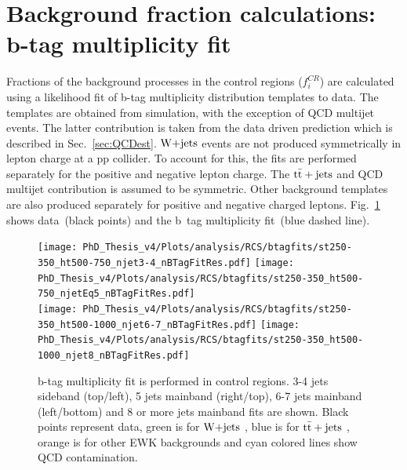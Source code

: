 \section{Background fraction calculations: b-tag multiplicity fit}
\label{sec:bkgcomp}
Fractions of the background processes in the control regions ($f^{CR}_i$) are calculated using a likelihood fit of b-tag multiplicity distribution templates to data. The templates are obtained from simulation, with the exception of QCD multijet events. The latter contribution is taken from the data driven prediction which is described in Sec.~\ref{sec:QCDest}.
$\textrm{W+jets}$ events are not produced symmetrically in lepton charge at a pp collider. To account for this, the fits are performed separately for the positive and negative lepton charge. The ${\rm t\bar{t}+jets}$ and QCD multijet contribution is assumed to be symmetric. Other background templates are also produced separately for positive and negative charged leptons. 
Fig.~\ref{fig:btagmult} shows data~(black points) and the b~tag multiplicity fit~(blue dashed line).
\begin{figure}[!hbt]
    \begin{center}
 \texttt{[image: PhD\_Thesis\_v4/Plots/analysis/RCS/btagfits/st250-350\_ht500-750\_njet3-4\_nBTagFitRes.pdf]}
 \texttt{[image: PhD\_Thesis\_v4/Plots/analysis/RCS/btagfits/st250-350\_ht500-750\_njetEq5\_nBTagFitRes.pdf]}\\
  \texttt{[image: PhD\_Thesis\_v4/Plots/analysis/RCS/btagfits/st250-350\_ht500-1000\_njet6-7\_nBTagFitRes.pdf]}
 \texttt{[image: PhD\_Thesis\_v4/Plots/analysis/RCS/btagfits/st250-350\_ht500-1000\_njet8\_nBTagFitRes.pdf]}
  \caption[The b-tag multiplicity fit examples]{ \label{fig:btagmult} b-tag multiplicity fit is performed in control regions. 3-4 jets sideband (top/left), 5 jets mainband (right/top), 6-7 jets mainband (left/bottom) and 8 or more jets mainband fits are shown. Black points represent data, green is for $\textrm{W+jets}$ , blue is for ${\rm t\bar{t}+jets}$ , orange is for other EWK backgrounds and  cyan colored lines show QCD contamination.
 }
  \end{center}
\end{figure}
